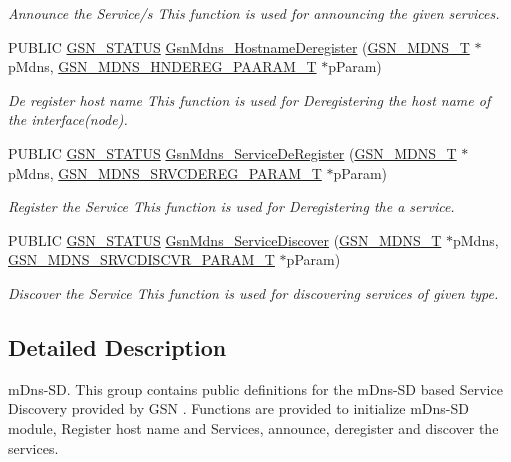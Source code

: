 \begin{DoxyCompactItemize}
\begin{DoxyCompactList}\small\item\em Announce the Service/s This function is used for announcing the given services. \end{DoxyCompactList}\item 
PUBLIC \hyperlink{a00660_gada5951904ac6110b1fa95e51a9ddc217}{GSN\_\-STATUS} \hyperlink{a00668_ga3233ac8be8015cb17ef7a0d539e77ea1}{GsnMdns\_\-HostnameDeregister} (\hyperlink{a00140}{GSN\_\-MDNS\_\-T} $\ast$pMdns, \hyperlink{a00142}{GSN\_\-MDNS\_\-HNDEREG\_\-PAARAM\_\-T} $\ast$pParam)
\begin{DoxyCompactList}\small\item\em De register host name This function is used for Deregistering the host name of the interface(node). \end{DoxyCompactList}\item 
PUBLIC \hyperlink{a00660_gada5951904ac6110b1fa95e51a9ddc217}{GSN\_\-STATUS} \hyperlink{a00668_ga5153718283ae021aae7c9d7a380005d6}{GsnMdns\_\-ServiceDeRegister} (\hyperlink{a00140}{GSN\_\-MDNS\_\-T} $\ast$pMdns, \hyperlink{a00147}{GSN\_\-MDNS\_\-SRVCDEREG\_\-PARAM\_\-T} $\ast$pParam)
\begin{DoxyCompactList}\small\item\em Register the Service This function is used for Deregistering the a service. \end{DoxyCompactList}\item 
PUBLIC \hyperlink{a00660_gada5951904ac6110b1fa95e51a9ddc217}{GSN\_\-STATUS} \hyperlink{a00668_gaa95c60f5fe29388290848f6d5037683d}{GsnMdns\_\-ServiceDiscover} (\hyperlink{a00140}{GSN\_\-MDNS\_\-T} $\ast$pMdns, \hyperlink{a00148}{GSN\_\-MDNS\_\-SRVCDISCVR\_\-PARAM\_\-T} $\ast$pParam)
\begin{DoxyCompactList}\small\item\em Discover the Service This function is used for discovering services of given type. \end{DoxyCompactList}\end{DoxyCompactItemize}


\subsection{Detailed Description}
mDns-\/SD. This group contains public definitions for the mDns-\/SD based Service Discovery provided by GSN . Functions are provided to initialize mDns-\/SD module, Register host name and Services, announce, deregister and discover the services. 

